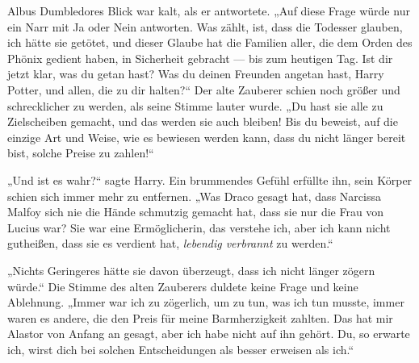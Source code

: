 Albus Dumbledores Blick war kalt, als er antwortete.
„Auf diese Frage würde nur ein Narr mit Ja oder Nein antworten. Was zählt, ist, dass die Todesser glauben, ich hätte sie getötet, und dieser Glaube hat die Familien aller, die dem Orden des Phönix gedient haben, in Sicherheit gebracht — bis zum heutigen Tag. Ist dir jetzt klar, was du getan hast? Was du deinen Freunden angetan hast, Harry Potter, und allen, die zu dir halten?“
Der alte Zauberer schien noch größer und schrecklicher zu werden, als seine Stimme lauter wurde.
„Du hast sie alle zu Zielscheiben gemacht, und das werden sie auch bleiben! Bis du beweist, auf die einzige Art und Weise, wie es bewiesen werden kann, dass du nicht länger bereit bist, solche Preise zu zahlen!“

„Und ist es wahr?“ sagte Harry.
Ein brummendes Gefühl erfüllte ihn, sein Körper schien sich immer mehr zu entfernen.
„Was Draco gesagt hat, dass Narcissa Malfoy sich nie die Hände schmutzig gemacht hat, dass sie nur die Frau von Lucius war? Sie war eine Ermöglicherin, das verstehe ich, aber ich kann nicht gutheißen, dass sie es verdient hat, \emph{lebendig verbrannt} zu werden.“

„Nichts Geringeres hätte sie davon überzeugt, dass ich nicht länger zögern würde.“ Die Stimme des alten Zauberers duldete keine Frage und keine Ablehnung.
„Immer war ich zu zögerlich, um zu tun, was ich tun musste, immer waren es andere, die den Preis für meine Barmherzigkeit zahlten. Das hat mir Alastor von Anfang an gesagt, aber ich habe nicht auf ihn gehört. Du, so erwarte ich, wirst dich bei solchen Entscheidungen als besser erweisen als ich.“

